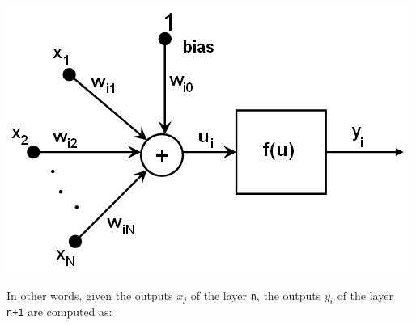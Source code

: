 \includegraphics{pics/neuron_model.png}

In other words, given the outputs \texttt{{$x_j$}} of the layer \texttt{n}, the outputs \texttt{{$y_i$}} of the layer \texttt{n+1} are computed as:


